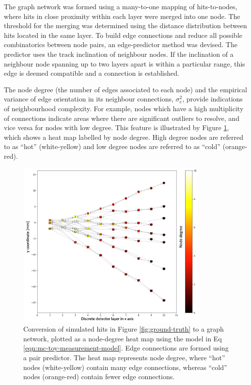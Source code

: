The graph network was formed using a many-to-one mapping of hits-to-nodes, where hits in close proximity within each layer were merged into one node. The threshold for the merging was determined using the distance distribution between hits located in the same layer. To build edge connections and reduce all possible combinatorics between node pairs, an edge-predictor method was devised. The predictor uses the track inclination of neighbour nodes. If the inclination of a neighbour node spanning up to two layers apart is within a particular range, this edge is deemed compatible and a connection is established. 

The node degree (the number of edges associated to each node) and the empirical variance of edge orientation in its neighbour connections, $\sigma_{e}^{2}$, provide indications of neighbourhood complexity. For example, nodes which have a high multiplicity of connections indicate areas where there are significant outliers to resolve, and vice versa for nodes with low degree. This feature is illustrated by Figure \ref{fig:heat-map}, which shows a heat map labelled by node degree. High degree nodes are referred to as ``hot'' (white-yellow) and low degree nodes are referred to as ``cold'' (orange-red).


\begin{figure}[htbp]
    \centering
    \includegraphics[width=0.85\textwidth]{images/5-gnn-algorithm/heatmap-network.png}
    \caption{Conversion of simulated hits in Figure \ref{fig:ground-truth} to a graph network, plotted as a node-degree heat map using the model in Eq \eqref{eqn:mc-toy-measurement-model}. Edge connections are formed using a pair predictor. The heat map represents node degree, where ``hot'' nodes (white-yellow) contain many edge connections, whereas ``cold'' nodes (orange-red) contain fewer edge connections.}
    \label{fig:heat-map}%
\end{figure}


